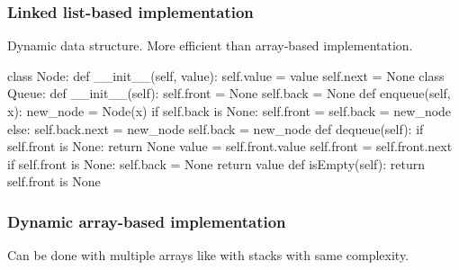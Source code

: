 \subsubsection{Linked list-based implementation}
Dynamic data structure. More efficient than array-based implementation.
\begin{python}
class Node:
    def __init__(self, value):
        self.value = value
        self.next = None
class Queue:
    def __init__(self):
        self.front = None
        self.back = None
    def enqueue(self, x):
        new_node = Node(x)
        if self.back is None:
            self.front = self.back = new_node
        else:
            self.back.next = new_node
            self.back = new_node
    def dequeue(self):
        if self.front is None:
            return None
        value = self.front.value
        self.front = self.front.next
        if self.front is None:
            self.back = None
        return value
    def isEmpty(self):
        return self.front is None
\end{python}


\subsubsection{Dynamic array-based implementation}
Can be done with multiple arrays like with stacks with same complexity.